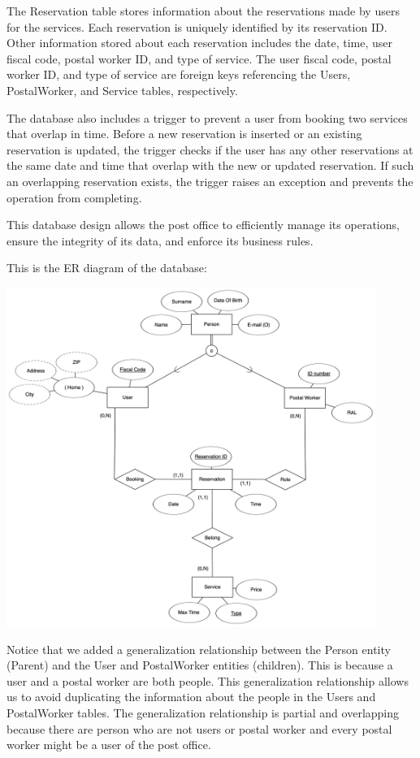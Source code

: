 \documentclass{article}
\begin{document}
The Reservation table stores information about the reservations made by users for the services. Each reservation is uniquely identified by its reservation ID\@. Other information stored about each reservation includes the date, time, user fiscal code, postal worker ID, and type of service. The user fiscal code, postal worker ID, and type of service are foreign keys referencing the Users, PostalWorker, and Service tables, respectively.

The database also includes a trigger to prevent a user from booking two services that overlap in time. Before a new reservation is inserted or an existing reservation is updated, the trigger checks if the user has any other reservations at the same date and time that overlap with the new or updated reservation. If such an overlapping reservation exists, the trigger raises an exception and prevents the operation from completing.

This database design allows the post office to efficiently manage its operations, ensure the integrity of its data, and enforce its business rules.

This is the ER diagram of the database:
\begin{center}
\includegraphics[width=12cm]{images/PostOfficeERdiagram.png}
\end{center}

Notice that we added a generalization relationship between the Person entity (Parent) and the User and PostalWorker entities (children). This is because a user and a postal worker are both people. This generalization relationship allows us to avoid duplicating the information about the people in the Users and PostalWorker tables. The generalization relationship is partial and overlapping because there are person who are not users or postal worker and every postal worker might be a user of the post office.
\end{document}
